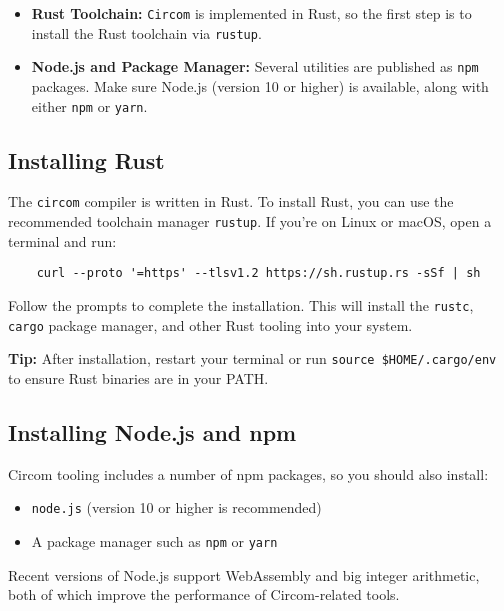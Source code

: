 \documentclass{article}
\begin{document}
\begin{itemize}
	\item \textbf{Rust Toolchain:} \texttt{Circom} is implemented in Rust, so the first step is to install the Rust toolchain via \texttt{rustup}.
	\item \textbf{Node.js and Package Manager:} Several utilities are published as \texttt{npm} packages. Make sure Node.js (version 10 or higher) is available, along with either \texttt{npm} or \texttt{yarn}.
\end{itemize}


\subsection{Installing Rust}

The \texttt{circom} compiler is written in Rust. To install Rust, you can use the recommended toolchain manager \texttt{rustup}. If you're on Linux or macOS, open a terminal and run:

\begin{verbatim}
	curl --proto '=https' --tlsv1.2 https://sh.rustup.rs -sSf | sh
\end{verbatim}

Follow the prompts to complete the installation. This will install the \texttt{rustc}, \texttt{cargo} package manager, and other Rust tooling into your system.
\begin{noteBox}
	\textbf{Tip:} After installation, restart your terminal or run \texttt{source \$HOME/.cargo/env} to ensure Rust binaries are in your PATH.
\end{noteBox}

\subsection{Installing Node.js and npm}

Circom tooling includes a number of npm packages, so you should also install:

\begin{itemize}
	\item \texttt{node.js} (version 10 or higher is recommended)
	\item A package manager such as \texttt{npm} or \texttt{yarn}
\end{itemize}

Recent versions of Node.js support WebAssembly and big integer arithmetic, both of which improve the performance of Circom-related tools.
\end{document}
